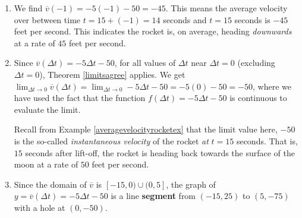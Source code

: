 \documentclass{ximera}
\begin{document}
\begin{example}
\begin{explanation}
\begin{enumerate}
Since $s(15) = -5(15)^2 + 100(15) = 375$, we get:

\[ \begin{array}{rclr}

\overline{v}(\Delta t)& = &  \frac{s(15+ \Delta t) - s(15)}{\Delta t} & \\  
 & = &  \frac{(-5(\Delta t)^2-50 \Delta t + 375) - 375}{\Delta t} & \\  
 & = &  \frac{\Delta t (-5 \Delta t - 50)}{\Delta t} & \\  
 & = &  \frac{\cancel{\Delta} t (-5 \Delta t - 50)}{\cancel{\Delta t}} & \\  
& = & -5 \Delta t - 50 & \text{$\Delta t \neq 0$} \\ \end{array} \]

In addition to $\Delta t \neq 0$,  the domain of $s$ is restricted to $0 \leq t \leq 20$.  Hence, we require  $0 \leq 15 + \Delta t \leq 20$ or  $-15 \leq \Delta t \leq 5$.  Our final answer is $\overline{v}(\Delta t) = -5 \Delta t - 50$, for $\Delta t \in [-15, 0) \cup (0, 5]$.



\item  We find  $\overline{v}(-1) = -5(-1) - 50 = -45$.  This means the average velocity over between time $t=15+(-1) = 14$ seconds and $t=15$ seconds is $-45$ feet per second.  This indicates the rocket is, on average, heading \textit{downwards} at a rate of $45$ feet per second.



\item  Since $\overline{v}(\Delta t) = -5 \Delta t - 50$, for all values of $\Delta t$ near $\Delta t = 0$ (excluding $\Delta t = 0$),  Theorem \ref{limitsagree} applies.  We get   $\lim_{\Delta t \rightarrow 0}  \overline{v}(\Delta t) = \lim_{\Delta t \rightarrow 0}  -5 \Delta t - 50 = -5(0) - 50 = -50$, where we have used the fact that the function $f(\Delta t) = -5 \Delta t - 50$ is continuous to evaluate the limit.



Recall from Example \ref{averagevelocityrocketex} that the limit value here, $-50$  is the so-called \textit{instantaneous velocity} of the rocket \textit{at} $t=15$ seconds.  That is, $15$ seconds after lift-off, the rocket is heading back towards the surface of the moon at a rate of $50$ feet per second. 



\item    Since the domain of $\overline{v}$ is $[-15, 0) \cup (0, 5]$, the graph of  $y =  \overline{v}(\Delta t) =  -5 \Delta t - 50$  is a line \textbf{segment} from $(-15, 25)$ to $(5, -75)$ with a hole at $(0, -50)$.


\end{enumerate}
\end{explanation}
\end{example}
\end{document}
